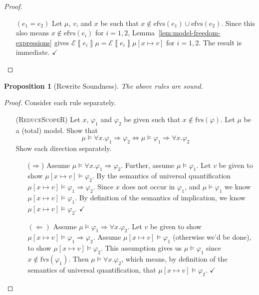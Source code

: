 \documentclass{article}
\newcommand{\denote}[1]{\left\llbracket#1\right\rrbracket}
\newcommand{\edenote}[1]{\mathcal{E}\denote{#1}}
\newcommand{\fvs}{\textrm{fvs}}
\newcommand{\efvs}{\textrm{efvs}}
\theoremstyle{plain}
\newtheorem{proposition}{Proposition}
\theoremstyle{definition}
\theoremstyle{remark}
\begin{document}
\begin{proof}
\begin{enumerate}[align=left]
  \item[$(e_{1} = e_{2})$] Let $\mu$, $v$, and $x$ be such that $x \not \in \efvs(e_{1})\cup\efvs(e_{2})$.
  Since this also means $x \not \in \efvs(e_{i})$ for $i = 1,2$, Lemma~\ref{lem:model-freedom-expressions} gives $\edenote{e_{i}}\mu = \edenote{e_{i}} \mu[x \mapsto v]$ for $i=1,2$. The result is immediate. \hfill $\checkmark$
  \end{enumerate}
\end{proof}

\begin{proposition}[Rewrite Soundness]
  The above rules are sound.
\end{proposition}
\begin{proof}
  Consider each rule separately.
  \begin{enumerate}[align=left]
    \item[(\textsc{ReduceScopeR})]
    Let $x$, $\varphi_{1}$ and $\varphi_{2}$ be given such that $x \not \in \fvs(\varphi)$. Let $\mu$ be a (total) model. Show that
    \[\mu \models \forall x. \varphi_{1} \Rightarrow \varphi_{2} \iff \mu \models \varphi_{1} \Rightarrow \forall x. \varphi_{2}\]
    Show each direction separately.
    \begin{enumerate}[align=left]
      \item[($\Rightarrow$)] Assume $\mu \models \forall x. \varphi_{1} \Rightarrow \varphi_{2}$. Further, assume $\mu \models \varphi_1$. Let $v$ be given to show $\mu[x \mapsto v] \models \varphi_{2}$. By the semantics of universal quantification $\mu[x \mapsto v] \models \varphi_{1} \Rightarrow \varphi_{2}$. Since $x$ does not occur in $\varphi_{1}$, and $\mu \models \varphi_{1}$ we know $\mu[x \mapsto v] \models \varphi_{1}$. By definition of the semantics of implication, we know $\mu[x \mapsto v] \models \varphi_{2}$. $\checkmark$

      \item[$(\Leftarrow)$] Assume $\mu \models \varphi_1 \Rightarrow \forall x. \varphi_{2}$.
      Let $v$ be given to show $\mu[x \mapsto v] \models \varphi_{1} \Rightarrow \varphi_{2}$.
      Assume $\mu[x \mapsto v] \models \varphi_{1}$ (otherwise we'd be done), to show $\mu[x \mapsto v] \models \varphi_{2}$.
      This assumption gives us $\mu \models \varphi_{1}$ since $x \not \in \fvs(\varphi_{1})$. Then
      $\mu \models \forall x. \varphi_{2}$, which means, by definition of the semantics of universal quantification, that $\mu[x \mapsto v] \models \varphi_{2}$. $\checkmark$
    \end{enumerate}


\end{enumerate}
\end{proof}
\end{document}
